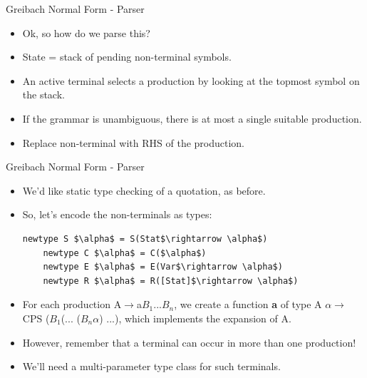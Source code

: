 \documentclass[10pt]{beamer}
\begin{document}
\begin{frame}[fragile]{Greibach Normal Form - Parser}

\begin{itemize}

\item Ok, so how do we parse this?
\item State = stack of pending non-terminal symbols.
\item An active terminal selects a production by looking at the topmost symbol on the stack.
\item If the grammar is unambiguous, there is at most a single suitable production.
\item Replace non-terminal with RHS of the production.

\end{itemize}

\end{frame}

\begin{frame}[fragile]{Greibach Normal Form - Parser}

\begin{itemize}

\item We'd like static type checking of a quotation, as before.
\item So, let's encode the non-terminals as types:

\begin{lstlisting}[mathescape=true, escapechar=!]
	newtype S $\alpha$ = S(Stat$\rightarrow \alpha$)
	newtype C $\alpha$ = C($\alpha$)
	newtype E $\alpha$ = E(Var$\rightarrow \alpha$)
	newtype R $\alpha$ = R([Stat]$\rightarrow \alpha$)
\end{lstlisting}

\item For each production A$\rightarrow$a$B_1...B_n$, we create a function \textbf{a} of type A $\alpha \rightarrow$ CPS ($B_1$(... ($B_n \alpha$) ...), which implements the expansion of A.

\item However, remember that a terminal can occur in more than one production!
\item We'll need a multi-parameter type class for such terminals.

\end{itemize}

\end{frame}
\end{document}
